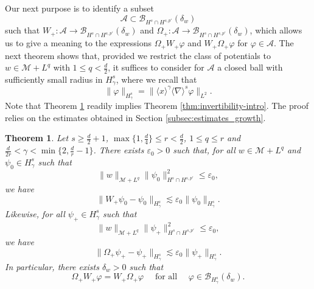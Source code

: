 \documentclass[12pt]{article}
\theoremstyle{plain}
\newtheorem{theo}{Theorem}[section]
\newcommand{\meas}{\mathcal{M}}
\begin{document}
Our next purpose is to identify a subset \begin{equation*}
    \mathcal{A}\subset\mathcal{B}_{H^s\cap H^{s,p'}}(\delta_w)  
\end{equation*} 
such that $W_+:\mathcal{A}\to\mathcal{B}_{H^s\cap H^{s,p'}}(\delta_w)$ and $\Omega_+:\mathcal{A}\to\mathcal{B}_{H^s\cap H^{s,p'}}(\delta_w)$, which allows us to give a meaning to the expressions $\Omega_+W_+\varphi$ and $W_+\Omega_+\varphi$ for $\varphi\in\mathcal{A}$. The next theorem shows that, provided we restrict the class of potentials to $w \in \meas+L^{q}$ with $1\le q<\frac d2$, it suffices to consider for $\mathcal{A}$ a closed ball with sufficiently small radius in $H^s_\gamma$, where we recall that
\begin{equation*}
    \|\varphi\|_{H^s_\gamma}=\|\langle x\rangle^\gamma\langle\nabla\rangle^s\varphi\|_{L^2}.
\end{equation*}
Note that Theorem \ref{thm:invertibility} readily implies Theorem \ref{thm:invertibility-intro}. The proof relies on the estimates obtained in Section \ref{subsec:estimates_growth}.


\begin{theo}\label{thm:invertibility}
    Let $s\ge\frac d2 +1$, $ \max \{1, \frac d4\} \leq r <\frac d2$, $1\le q\le r $ and $\frac{d}{2r}<\gamma<\min \{2, \frac dr-1\}$. There exists $\varepsilon_0>0$ such that, for all $w \in \meas+L^{q}$ and $\psi_0\in H^s_\gamma$ such that
		\begin{equation*}
			\|w\|_{\meas+L^{q}} \| \psi_0\|_{H^s\cap H^{s,p'}}^2\le\varepsilon_0,
		\end{equation*}
	we have
	\begin{equation}\label{eq:boundW+}
	    \|W_+\psi_0-\psi_0\|_{H^s_\gamma}\lesssim\varepsilon_0\|\psi_0\|_{H^s_\gamma}.
	\end{equation}
	Likewise, for all $\psi_+\in H^s_\gamma$ such that
		\begin{equation*}
			\|w\|_{\meas+L^{q}} \| \psi_+\|_{H^s\cap H^{s,p'}}^2\le\varepsilon_0,
		\end{equation*}
	we have
	\begin{equation}\label{eq:boundOmega+}
	    \|\Omega_+\psi_+-\psi_+\|_{H^s_\gamma}\lesssim\varepsilon_0\|\psi_+\|_{H^s_\gamma}.
	\end{equation}
	In particular, there exists $\delta_w>0$ such that 
	\begin{equation*}
	\Omega_+W_+\varphi=W_+\Omega_+\varphi \quad\text{ for all }\quad\varphi\in\mathcal{B}_{H^s_\gamma}(\delta_w).
	\end{equation*}
\end{theo}
\end{document}
